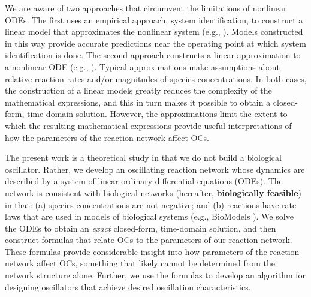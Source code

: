 \documentclass{bmcart}
\begin{document}
We are aware of two approaches that circumvent the limitations of nonlinear ODEs. The first uses an empirical approach, system identification, to construct a linear model that approximates the nonlinear system  (e.g., \cite{mahrou2022}). Models constructed in this way provide accurate predictions near the operating point at which system identification is done. The second approach constructs a linear approximation to a nonlinear ODE (e.g.,  \cite{kut_analytical_2009}). Typical approximations make assumptions about relative reaction rates and/or magnitudes of species concentrations. In both cases, the construction of a linear models greatly reduces the complexity of the mathematical expressions, and this in turn makes it possible to obtain a closed-form, time-domain solution. However, the approximations limit the extent to which the resulting mathematical expressions provide useful interpretations of how the parameters of the reaction network affect OCs.

The present work is a theoretical study in that we do not build a biological oscillator. Rather, we develop an oscillating reaction network whose dynamics are described by a system of linear ordinary differential equations (ODEs). The network is consistent with biological networks (hereafter, {\bf biologically feasible}) in that: (a) species concentrations are not negative; and (b) reactions have rate laws that are used in models of biological systems (e.g., BioModels \cite{malik-sheriff_biomodels-15_2020}). We solve the ODEs to obtain an {\em exact} closed-form, time-domain solution, and then construct formulas that relate OCs to the parameters of our reaction network. These formulas provide considerable insight into how parameters of the reaction network affect OCs, something that likely cannot be determined from the network structure alone. Further, we use the formulas to develop an algorithm for designing oscillators that achieve desired oscillation characteristics.
\end{document}
